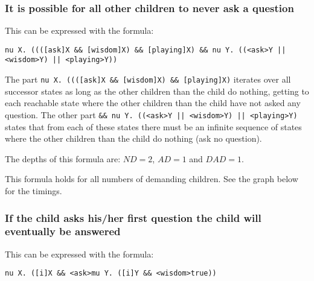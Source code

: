 \documentclass[10pt,a4paper]{article}
\begin{document}
\subsubsection{It is possible for all other children to never ask a question}
This can be expressed with the formula:

\begin{center}
	{\tt nu X. ((([ask]X \&\& [wisdom]X) \&\& [playing]X) \&\& nu Y. ((<ask>Y || <wisdom>Y) || <playing>Y))}
\end{center}

The part {\tt nu X. ((([ask]X \&\& [wisdom]X) \&\& [playing]X)} iterates over all successor states as long as the other children than the child do nothing, getting to each reachable state where the other children than the child have not asked any question. The other part {\tt \&\& nu Y. ((<ask>Y || <wisdom>Y) || <playing>Y)} states that from each of these states there must be an infinite sequence of states where the other children than the child do nothing (ask no question).

The depths of this formula are: $ND = 2$, $AD = 1$ and $DAD = 1$.

This formula holds for all numbers of demanding children. See the graph below for the timings.


\subsubsection{If the child asks his/her first question the child will eventually be answered}
This can be expressed with the formula:

\begin{center}
	{\tt nu X. ([i]X \&\& <ask>mu Y. ([i]Y \&\& <wisdom>true))}
\end{center}	
	
\end{document}
